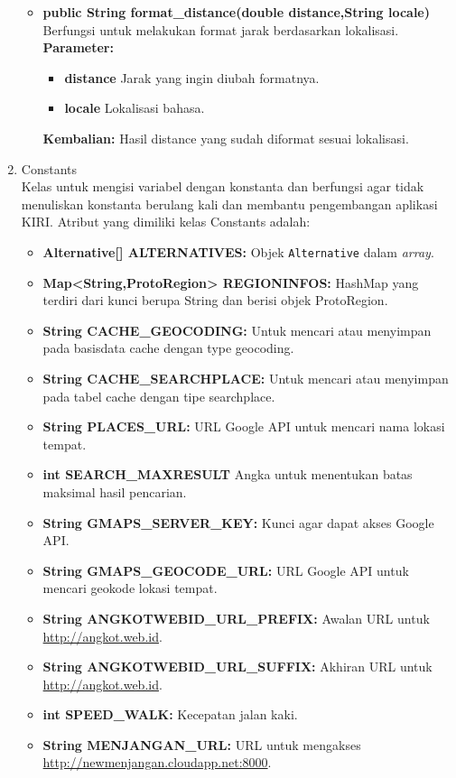 \begin{enumerate}
\begin{itemize}
		\item \textbf{public String format\_distance(double distance,String locale)}\\
		Berfungsi untuk melakukan format jarak berdasarkan lokalisasi.\\
		\textbf{Parameter:}
				\begin{itemize}
					\item \textbf{distance} Jarak yang ingin diubah formatnya.
					\item \textbf{locale} Lokalisasi bahasa.
				\end{itemize}
		\textbf{Kembalian:}  Hasil distance yang sudah diformat sesuai lokalisasi.
	\end{itemize}
	\item Constants\\
	Kelas untuk mengisi variabel dengan konstanta dan berfungsi agar tidak menuliskan konstanta berulang kali dan membantu pengembangan aplikasi KIRI. Atribut yang dimiliki kelas Constants adalah:
	\begin{itemize}
		\item \textbf{Alternative[] ALTERNATIVES:} Objek \verb!Alternative! dalam \textit{array}.
		\item \textbf{Map<String,ProtoRegion> REGIONINFOS:} HashMap yang terdiri dari kunci berupa String dan berisi objek ProtoRegion.
		\item \textbf{String CACHE\_GEOCODING:} Untuk mencari atau menyimpan pada basisdata cache dengan type geocoding.
		\item \textbf{String CACHE\_SEARCHPLACE:} Untuk mencari atau menyimpan pada tabel cache dengan tipe searchplace.
		\item \textbf{String PLACES\_URL:} URL Google API untuk mencari nama lokasi tempat.
		\item \textbf{int SEARCH\_MAXRESULT} Angka untuk menentukan batas maksimal hasil pencarian.
		\item \textbf{String GMAPS\_SERVER\_KEY:} Kunci agar dapat akses Google API.
		\item \textbf{String GMAPS\_GEOCODE\_URL:} URL Google API untuk mencari geokode lokasi tempat.
		\item \textbf{String ANGKOTWEBID\_URL\_PREFIX:} Awalan URL untuk \url{http://angkot.web.id}.
		\item \textbf{String ANGKOTWEBID\_URL\_SUFFIX:} Akhiran URL untuk \url{http://angkot.web.id}.
		\item \textbf{int SPEED\_WALK:} Kecepatan jalan kaki.
		\item \textbf{String MENJANGAN\_URL:} URL untuk mengakses \url{http://newmenjangan.cloudapp.net:8000}.

\end{itemize}
\end{enumerate}
